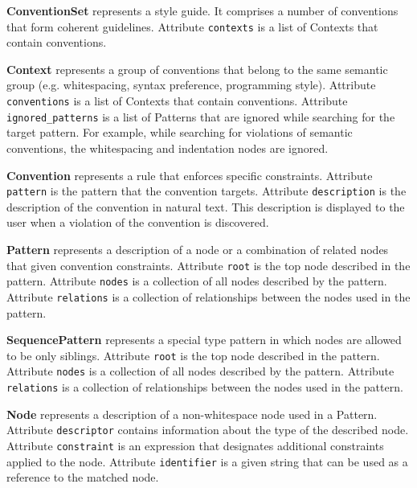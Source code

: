 \documentclass[parskip=full]{uvamscse}
\begin{document}
\begin{description}

\item\textbf{ConventionSet} represents a style guide. It comprises a number of conventions that form coherent guidelines. Attribute \texttt{contexts} is a list of Contexts that contain conventions.


\item\textbf{Context} represents a group of conventions that belong to the same semantic group (e.g. whitespacing, syntax preference, programming style). Attribute \texttt{conventions} is a list of Contexts that contain conventions. Attribute \texttt{ignored\_patterns} is a list of Patterns that are ignored while searching for the target pattern. For example, while searching for violations of semantic conventions, the whitespacing and indentation nodes are ignored.


\item\textbf{Convention} represents a rule that enforces specific constraints. Attribute \texttt{pattern} is the pattern that the convention targets. Attribute \texttt{description} is the description of the convention in natural text. This description is displayed to the user when a violation of the convention is discovered.


\item\textbf{Pattern} represents a description of a node or a combination of related nodes that given convention constraints.  Attribute \texttt{root} is the top node described in the pattern. Attribute \texttt{nodes} is a collection of all nodes described by the pattern. Attribute \texttt{relations} is a collection of relationships between the nodes used in the pattern.


\item\textbf{SequencePattern} represents a special type pattern in which nodes are allowed to be only siblings. Attribute \texttt{root} is the top node described in the pattern. Attribute \texttt{nodes} is a collection of all nodes described by the pattern. Attribute \texttt{relations} is a collection of relationships between the nodes used in the pattern.


\item\textbf{Node} represents a description of a non-whitespace node used in a Pattern.  
Attribute \texttt{descriptor} contains information about the type of the described node. Attribute \texttt{constraint} is an expression that designates additional constraints applied to the node. Attribute \texttt{identifier} is a given string that can be used as a reference to the matched node.



\end{description}
\end{document}
